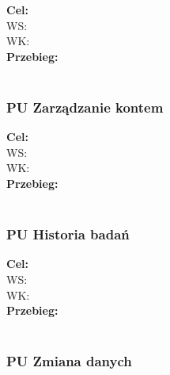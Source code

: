\documentclass[12pt, letterpaper]{article}
\begin{document}
		\quad
		
		\textbf{Cel: }\\
		
		WS: \\
		
		WK: \\
		
		\textbf{Przebieg:}\\
		 \\
		 
		
		\subsubsection{PU Zarządzanie kontem}
		
		\quad
		
		\textbf{Cel: }\\
		
		WS: \\
		
		WK: \\
		
		\textbf{Przebieg:}\\
		 \\
		 
		
		\subsubsection{PU Historia badań}
		
		\quad
		
		\textbf{Cel: }\\
		
		WS: \\
		
		WK: \\
		
		\textbf{Przebieg:}\\
		 \\
		 
		
		\subsubsection{PU Zmiana danych}
		
\end{document}

